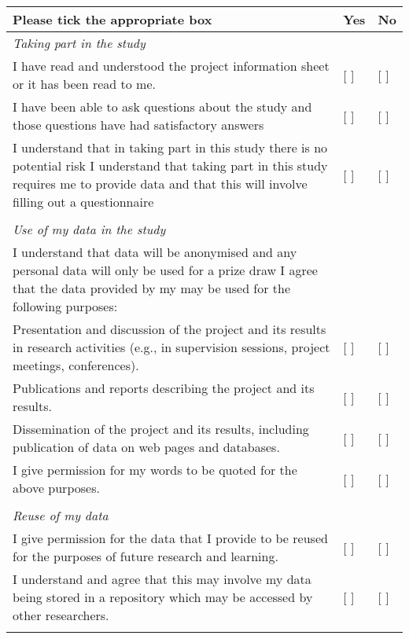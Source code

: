 \documentclass[12pt, a4paper]{report}
\begin{document}
\maketitle

\begin{table}
  \begin{tabular}{p{}p{}p{}}
    Please tick the appropriate box & Yes & No \\
    \hline
    \emph{Taking part in the study}  & & \\
    I have read and understood the project information sheet or it has been read to me. & [ ] & [ ] \\
    I have been able to ask questions about the study and those questions have had satisfactory answers & [ ] & [ ] \\
    I understand that in taking part in this study there is no potential risk
    I understand that taking part in this study requires me to provide data and that this will involve filling out a questionnaire & [ ] & [ ] \\
     & & \\
    \emph{Use of my data in the study} & & \\
    I understand that data will be anonymised and any personal data will only be used for a prize draw
    I agree that the data provided by my may be used for the following purposes: & & \\
    Presentation and discussion of the project and its results in research activities (e.g., in supervision sessions, project meetings, conferences). & [ ] & [ ] \\
    Publications and reports describing the project and its results. & [ ] & [ ] \\
    Dissemination of the project and its results, including publication of data on web pages and databases. & [ ] & [ ] \\
    I give permission for my words to be quoted for the above purposes. & [ ] & [ ] \\
     & & \\
    \emph{Reuse of my data} & & \\
    I give permission for the data that I provide to be reused for the purposes of future research and learning. & [ ] & [ ] \\
    I understand and agree that this may involve my data being stored in a repository which may be accessed by other researchers. & [ ] & [ ] \\
     & & \\

\end{tabular}
\end{table}
\end{document}
